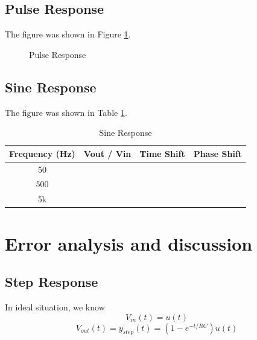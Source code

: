 \documentclass{article}
\begin{document}
\subsection{Pulse Response}
The figure was shown in Figure \ref{fig-2}.

\begin{figure}[htbp]
	\centering
	\caption{Pulse Response}
	\label{fig-2}
\end{figure}

\subsection{Sine Response}
The figure was shown in Table \ref{tab-3}.

\begin{table}
	\centering
	\begin{tabular}{|c|c|c|c|}
		\hline
		Frequency (Hz) & Vout / Vin & Time Shift & Phase Shift \\
		\hline
		50 &&&\\
		\hline
		500 &&&\\
		\hline
		5k &&&\\
		\hline
	\end{tabular}
	\caption{Sine Response}
	\label{tab-3}
\end{table}

\section{Error analysis and discussion}
\subsection{Step Response}
In ideal situation, we know
$$V_{in}(t)=u(t)$$
$$V_{out}(t)=y_{step}(t)=(1-e^{-t/RC})u(t)$$
\end{document}
